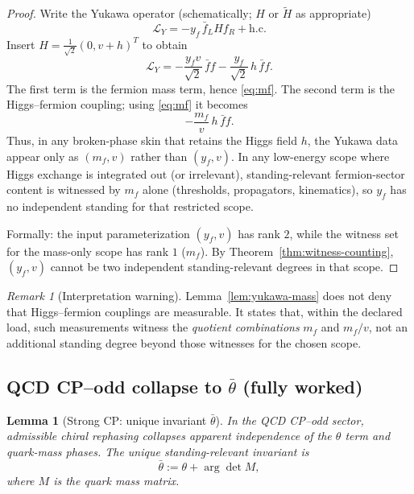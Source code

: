 \documentclass[11pt]{article}
\newtheorem{lemma}[definition]{Lemma}
\theoremstyle{remark}
\newtheorem{remark}[definition]{Remark}
\begin{document}
\begin{proof}
Write the Yukawa operator (schematically; $H$ or $\tilde H$ as appropriate)
\begin{equation}\label{eq:yukawa}
\mathcal{L}_Y=-y_f\,\bar f_L H f_R+\mathrm{h.c.}
\end{equation}
Insert $H=\frac{1}{\sqrt2}(0,v+h)^T$ to obtain
\begin{equation}\label{eq:yukawa-expanded}
\mathcal{L}_Y=-\frac{y_f v}{\sqrt2}\,\bar f f -\frac{y_f}{\sqrt2}\,h\,\bar f f.
\end{equation}
The first term is the fermion mass term, hence \eqref{eq:mf}.
The second term is the Higgs--fermion coupling; using \eqref{eq:mf} it becomes
\begin{equation}
-\frac{m_f}{v}\,h\,\bar f f.
\end{equation}
Thus, in any broken-phase skin that retains the Higgs field $h$, the Yukawa data appear only as
$(m_f,v)$ rather than $(y_f,v)$.
In any low-energy scope where Higgs exchange is integrated out (or irrelevant), standing-relevant
fermion-sector content is witnessed by $m_f$ alone (thresholds, propagators, kinematics), so $y_f$
has no independent standing for that restricted scope.

Formally: the input parameterization $(y_f,v)$ has rank $2$, while the witness set for the mass-only
scope has rank $1$ ($m_f$). By Theorem~\ref{thm:witness-counting}, $(y_f,v)$ cannot be two independent
standing-relevant degrees in that scope.
\end{proof}

\begin{remark}[Interpretation warning]\label{rem:yuk-interpret}
Lemma~\ref{lem:yukawa-mass} does not deny that Higgs--fermion couplings are measurable. It states that,
within the declared load, such measurements witness the \emph{quotient combinations} $m_f$ and $m_f/v$,
not an additional standing degree beyond those witnesses for the chosen scope.
\end{remark}


\subsection{QCD CP--odd collapse to $\bar\theta$ (fully worked)}

\begin{lemma}[Strong CP: unique invariant $\bar\theta$]\label{lem:theta}
In the QCD CP--odd sector, admissible chiral rephasing collapses apparent independence of the
$\theta$ term and quark-mass phases. The unique standing-relevant invariant is
\begin{equation}\label{eq:thetabar}
\bar\theta:=\theta+\arg\det M,
\end{equation}
where $M$ is the quark mass matrix.
\end{lemma}
\end{document}
